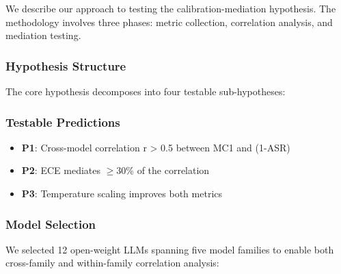 
We describe our approach to testing the calibration-mediation hypothesis. The methodology involves three phases: metric collection, correlation analysis, and mediation testing.

\subsubsection{Hypothesis Structure}

The core hypothesis decomposes into four testable sub-hypotheses:

\begin{table}[htbp]
\centering
{}
\end{table}

\subsubsection{Testable Predictions}

\begin{itemize}
\item \textbf{P1}: Cross-model correlation r > 0.5 between MC1 and (1-ASR)
\item \textbf{P2}: ECE mediates $\geq 30$\% of the correlation
\item \textbf{P3}: Temperature scaling improves both metrics
\end{itemize}

\subsubsection{Model Selection}

We selected 12 open-weight LLMs spanning five model families to enable both cross-family and within-family correlation analysis:

\begin{table}[htbp]
\centering
{}
\end{table}

